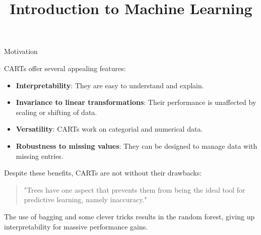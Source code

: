 \documentclass[11pt,compress,t,notes=noshow, xcolor=table]{beamer}
\title{Introduction to Machine Learning}
\institute{\href{https://compstat-lmu.github.io/lecture_i2ml/}{compstat-lmu.github.io/lecture\_i2ml}}
\date{}
\begin{document}
\sloppy

\begin{vbframe}{Motivation}

CARTs offer several appealing features:

\begin{itemize}
  \item \textbf{Interpretability}: They are easy to understand and explain.
  \item \textbf{Invariance to linear transformations}: Their performance is unaffected by scaling or shifting of data.
  \item \textbf{Versatility}: CARTs work on categorial and numerical data.
  \item \textbf{Robustness to missing values}: They can be designed to manage data with missing entries.
\end{itemize}

\vspace{1em}
Despite these benefits, CARTs are not without their drawbacks:
\vspace{1em}

\begin{quotation}
"Trees have one aspect that prevents them from being the ideal tool for predictive learning, namely inaccuracy."
\end{quotation}

\vspace{1em}
The use of bagging and some clever tricks results in the random forest, giving up interpretability for massive performance gains.

\end{vbframe}
\end{document}
